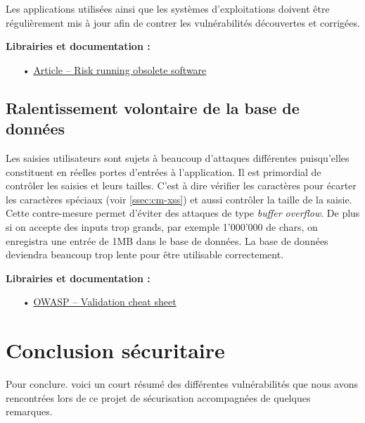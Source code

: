 Les applications utilisées ainsi que les systèmes d'exploitations doivent être régulièrement mis à jour afin de contrer les vulnérabilités découvertes et corrigées.

\medskip
\textbf{Librairies et documentation :}

\begin{itemize}
\item[•] \href{http://techgenix.com/risk-running-obsolete-software-part1/}{Article -- Risk running obsolete software}
\end{itemize}

\subsection{Ralentissement volontaire de la base de données}
\label{ssec:cm-oversizing}

Les saisies utilisateurs sont sujets à beaucoup d'attaques différentes puisqu'elles constituent en réelles portes d'entrées à l'application. Il est primordial de contrôler les saisies et leurs tailles. C'est à dire vérifier les caractères pour écarter les caractères spéciaux (voir \autoref{ssec:cm-xss}) et aussi contrôler la taille de la saisie. Cette contre-mesure permet d'éviter des attaques de type \emph{buffer overflow}. De plus si on accepte des inputs trop grands, par exemple  1'000'000 de chars, on enregistra une entrée de 1MB dans le base de données. La base de données deviendra beaucoup trop lente pour être utilisable correctement.

\medskip
\textbf{Librairies et documentation :}

\begin{itemize}
\item[•] \href{https://www.owasp.org/index.php/Input_Validation_Cheat_Sheet}{OWASP -- Validation cheat sheet}
\end{itemize}

\clearpage
\section{Conclusion sécuritaire}
\label{sec:conclusion}

Pour conclure. voici un court résumé des différentes vulnérabilités que nous avons rencontrées lors de ce projet de sécurisation accompagnées de quelques remarques.
\vspace{5mm}

